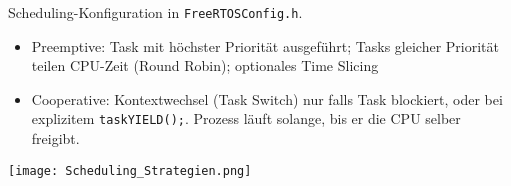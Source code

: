 Scheduling-Konfiguration in \lstinline[style=cppstyle]|FreeRTOSConfig.h|.

\begin{itemize}
	\itemsep-.5em 
	\item Preemptive:	Task mit höchster Priorität ausgeführt; Tasks gleicher Priorität teilen CPU-Zeit (Round Robin);	optionales Time Slicing
	\item Cooperative:	Kontextwechsel (Task Switch) nur falls Task blockiert, oder bei explizitem \lstinline[style=cppstyle]|taskYIELD();|. Prozess läuft solange, bis er die CPU selber freigibt.
\end{itemize}

\texttt{[image: Scheduling\_Strategien.png]}

